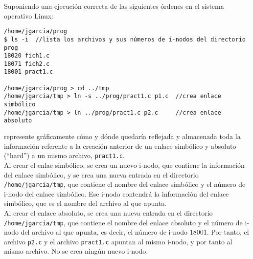 \begin{ejercicio}
Suponiendo una ejecución correcta de las siguientes órdenes en el sistema operativo Linux:
\begin{verbatim}
/home/jgarcia/prog
$ ls -i  //lista los archivos y sus números de i-nodos del directorio prog
18020 fich1.c
18071 fich2.c
18001 pract1.c

/home/jgarcia/prog > cd ../tmp
/home/jgarcia/tmp > ln -s ../prog/pract1.c p1.c  //crea enlace simbólico
/home/jgarcia/tmp > ln ../prog/pract1.c p2.c     //crea enlace absoluto
\end{verbatim}
represente gráficamente cómo y dónde quedaría reflejada y almacenada toda la información referente a la creación anterior de un enlace simbólico y absoluto (``hard'') a un mismo archivo, \verb|pract1.c|.\\

    Al crear el enlae simbólico, se crea un nuevo i-nodo, que contiene la información del enlace simbólico,
    y se crea una nueva entrada en el directorio \verb|/home/jgarcia/tmp|, que contiene el nombre del enlace simbólico
    y el número de i-nodo del enlace simbólico. Ese i-nodo contendrá la información del enlace simbólico, que es
    el nombre del archivo al que apunta.\\

    Al crear el enlace absoluto, se crea una nueva entrada en el directorio \verb|/home/jgarcia/tmp|, que contiene
    el nombre del enlace absoluto y el número de i-nodo del archivo al que apunta, es decir, el número de i-nodo $18001$.
    Por tanto, el archivo \verb|p2.c| y el archivo \verb|pract1.c| apuntan al mismo i-nodo, y por tanto al mismo archivo.
    No se crea ningún nuevo i-nodo.
\end{ejercicio}

